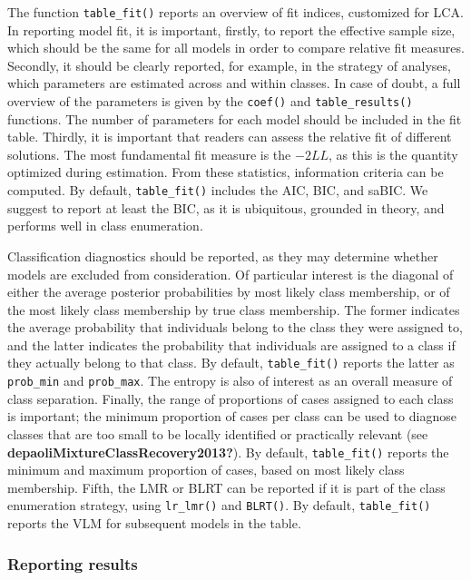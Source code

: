 \documentclass[
  ,man,floatsintext]{apa6}
\begin{document}
The function \texttt{table\_fit()} reports an overview of fit indices,
customized for LCA. In reporting model fit, it is important, firstly, to
report the effective sample size, which should be the same for all
models in order to compare relative fit measures. Secondly, it should be
clearly reported, for example, in the strategy of analyses, which
parameters are estimated across and within classes. In case of doubt, a
full overview of the parameters is given by the \texttt{coef()} and
\texttt{table\_results()} functions. The number of parameters for each model
should be included in the fit table. Thirdly, it is important that
readers can assess the relative fit of different solutions. The most
fundamental fit measure is the \(-2LL\), as this is the quantity optimized
during estimation. From these statistics, information criteria can be
computed. By default, \texttt{table\_fit()} includes the AIC, BIC, and saBIC. We
suggest to report at least the BIC, as it is ubiquitous, grounded in
theory, and performs well in class enumeration.

Classification diagnostics should be reported, as they may determine
whether models are excluded from consideration. Of particular interest
is the diagonal of either the average posterior probabilities by most
likely class membership, or of the most likely class membership by true
class membership. The former indicates the average probability that
individuals belong to the class they were assigned to, and the latter
indicates the probability that individuals are assigned to a class if
they actually belong to that class. By default, \texttt{table\_fit()} reports
the latter as \texttt{prob\_min} and \texttt{prob\_max}. The entropy is also of interest
as an overall measure of class separation. Finally, the range of
proportions of cases assigned to each class is important; the minimum
proportion of cases per class can be used to diagnose classes that are
too small to be locally identified or practically relevant (see \textbf{depaoliMixtureClassRecovery2013?}). By default, \texttt{table\_fit()} reports the
minimum and maximum proportion of cases, based on most likely class
membership. Fifth, the LMR or BLRT can be reported if it is part of the
class enumeration strategy, using \texttt{lr\_lmr()} and \texttt{BLRT()}. By default,
\texttt{table\_fit()} reports the VLM for subsequent models in the table.

\hypertarget{reporting-results}{%
\subsubsection{Reporting results}\label{reporting-results}}
\end{document}
